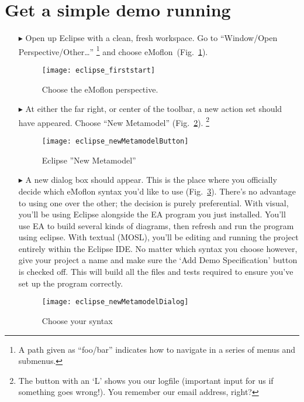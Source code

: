\newpage
\genHeader

\section{Get a simple demo running}

\begin{itemize}
\item[$\blacktriangleright$] Open\hypertarget{simpleDemo common}{} up Eclipse with a clean, fresh workspace. Go to ``Window/Open Perspective/Other\ldots'' \footnote{A path given as ``foo/bar'' indicates how to navigate in a series of menus and submenus.} and choose eMoflon~(Fig.~\ref{fig_eclipse}).

\begin{figure}[htbp]
	\centering
  \texttt{[image: eclipse\_firststart]}
	\caption{Choose the eMoflon perspective.}
	\label{fig_eclipse}
\end{figure} 

\item[$\blacktriangleright$] At either the far right, or center of the toolbar, a new action set should have appeared. Choose ``New Metamodel'' (Fig.~\ref{fig_eclipseNewMetamodelButton}).
\footnote{The button with an `L' shows you our logfile (important input for us if something goes wrong!). You remember our email address, right?}

\begin{figure}[htbp]
	\centering
  \texttt{[image: eclipse\_newMetamodelButton]}
	\caption{Eclipse ''New Metamodel''}
	\label{fig_eclipseNewMetamodelButton}
\end{figure}

\item[$\blacktriangleright$] A new dialog box should appear. This is the place where you officially decide which eMoflon syntax you'd like to use (Fig.~\ref{fig_chooseSyntax}). There's no advantage to using one over the other; the decision is purely preferential. With visual, you'll be using Eclipse alongside the EA program you just installed. You'll use EA to build several kinds of diagrams, then refresh and run the program using eclipse. With textual (MOSL), you'll be editing and running the project entirely within the Eclipse IDE. No matter which syntax you choose however, give your project a name and make sure the `Add Demo Specification' button is checked off. This will build all the files and tests required to ensure you've set up the program correctly.  

\vspace{1cm}

\begin{figure}[htbp]
	\centering
  \texttt{[image: eclipse\_newMetamodelDialog]}
	\caption{Choose your syntax}
	\label{fig_chooseSyntax}
\end{figure} 
\end{itemize}



